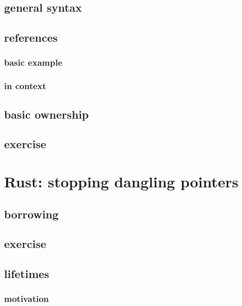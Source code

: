 \subsection{general syntax}


\subsection{references}
\subsubsection{basic example}


\subsubsection{in context}


\subsection{basic ownership}


\subsection{exercise}


\section{Rust: stopping dangling pointers}


\subsection{borrowing}


\subsection{exercise}


\subsection{lifetimes}

\subsubsection{motivation}


